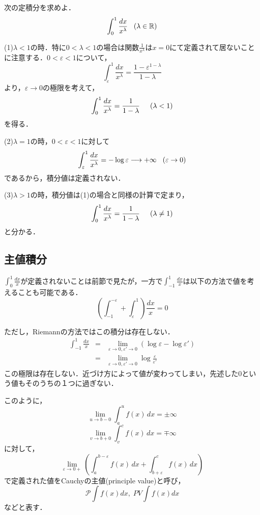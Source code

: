 \documentclass[uplatex, dvipdfmx]{jsreport}
\begin{document}
\begin{screen}
    \begin{example}[調和級数が発散することとのつながりを感じる例]次の定積分を求めよ．
        $$\int^1_0\frac{dx}{x^\lambda}\hspace{3mm}(\lambda\in\mathbb{R})$$

        \rm (1)\;$\lambda <1$の時．特に$0<\lambda <1$の場合は関数$\frac{1}{x^\lambda}$は$x=0$にて定義されて居ないことに注意する．$0<\varepsilon <1$について，
        $$\int^1_\varepsilon \frac{dx}{x^\lambda} = \frac{1-\varepsilon^{1-\lambda}}{1-\lambda}$$より，$\varepsilon\to 0$の極限を考えて，
        $$\int^1_0 \frac{dx}{x^\lambda} = \frac{1}{1-\lambda} \hspace{5mm} (\lambda <1)$$を得る．

        (2)\;$\lambda = 1$の時，$0<\varepsilon <1$に対して
        $$\int^1_\varepsilon \frac{dx}{x^\lambda}=-\log\varepsilon \longrightarrow +\infty \hspace{3mm} (\varepsilon\to 0)$$
        であるから，積分値は定義されない．

        (3)\;$\lambda>1$の時，積分値は(1)の場合と同様の計算で定まり，
        $$\int^1_0 \frac{dx}{x^\lambda} = \frac{1}{1-\lambda} \hspace{5mm} (\lambda \neq 1)$$
        と分かる．
    \end{example}
\end{screen}

\subsection{主値積分}

$\int^1_0\frac{dx}{x}$が定義されないことは前節で見たが，一方で$\int^1_{-1}\frac{dx}{x}$は以下の方法で値を考えることも可能である．
\[ \left( \int^{-\varepsilon}_{-1} + \int^1_\varepsilon \right) \frac{dx}{x}=0 \]

ただし，Riemannの方法ではこの積分は存在しない．
\begin{eqnarray*}
    \int^1_{-1}\frac{dx}{x} &=& \lim_{\varepsilon\to 0, \varepsilon'\to 0} \left( \log\varepsilon - \log\varepsilon' \right) \\
    &=& \lim_{\varepsilon\to 0, \varepsilon'\to 0} \log\frac{\varepsilon}{\varepsilon'}
\end{eqnarray*}
この極限は存在しない．近づけ方によって値が変わってしまい，先述した0という値もそのうちの１つに過ぎない．

このように，
$$\lim_{u\rightarrow b-0}\int_a^u f(x)\,dx=\pm\infty$$
$$\lim_{v\rightarrow b+0}\int_v^c f(x)\,dx=\mp\infty$$
に対して，
$$\lim_{\varepsilon\rightarrow 0+} \left(\int_a^{b-\varepsilon} f(x)\,dx + \int_{b+\varepsilon}^c f(x)\,dx \right)$$
で定義された値をCauchyの主値(principle value)と呼び，$$\mathcal{P}\int f(x)dx, \; PV\int f(x)dx$$などと表す．
\end{document}
